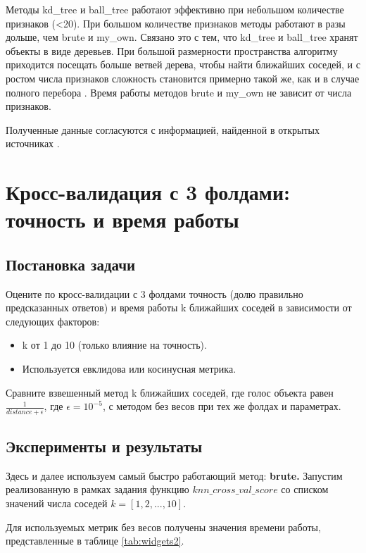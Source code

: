 \documentclass{article}
\begin{document}
\par Методы kd\_tree и ball\_tree работают эффективно при небольшом количестве признаков (<20). При большом количестве признаков методы работают в разы дольше, чем brute и my\_own. Связано это с тем, что kd\_tree и ball\_tree хранят объекты в виде деревьев. При большой размерности пространства алгоритму приходится посещать больше ветвей дерева, чтобы найти ближайших соседей, и с ростом числа признаков сложность становится примерно такой же, как и в случае полного перебора \cite{ss1}. Время работы методов brute и my\_own не зависит от числа признаков.

Полученные данные согласуются с информацией, найденной в открытых источниках \cite{ss2}.

\section{Кросс-валидация с 3 фолдами: точность и время работы}

\subsection{Постановка задачи}

Оцените по кросс-валидации с 3 фолдами точность (долю правильно предсказанных ответов) и время работы k ближайших соседей в зависимости от следующих факторов:

\begin{itemize}
    \item k от 1 до 10 (только влияние на точность).
    \item Используется евклидова или косинусная метрика.
\end{itemize}

Сравните взвешенный метод k ближайших соседей, где голос объекта равен $\frac{1}{distance  +  \epsilon}$, где $ \epsilon = {10}^{-5} $, с методом без весов при тех же фолдах и параметрах.

\subsection{Эксперименты и результаты} \hypertarget{3.2}{}
Здесь и далее используем самый быстро работающий метод: \textbf{brute.}
Запустим реализованную в рамках задания функцию $ knn\_cross\_val\_score $ со списком значений числа соседей 
$ k = [1, 2, ..., 10]. $ 

Для используемых метрик без весов получены значения времени работы, представленные в таблице \ref{tab:widgets2}.
\end{document}
